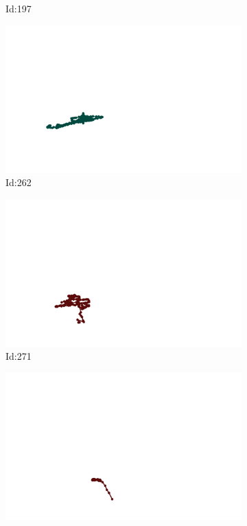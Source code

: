 \documentclass[12pt,twoside]{report}
\begin{document}
\begin{figure}
\begin{subfigure}[b]{0.20\textwidth}
\caption{Id:197}
\end{subfigure}
\begin{subfigure}[b]{0.20\textwidth}
\centering
\includegraphics[width=\textwidth]{../trajectories/262.png}
\caption{Id:262}
\end{subfigure}
\begin{subfigure}[b]{0.20\textwidth}
\centering
\includegraphics[width=\textwidth]{../trajectories/271.png}
\caption{Id:271}
\end{subfigure}
\begin{subfigure}[b]{0.20\textwidth}
\centering
\includegraphics[width=\textwidth]{../trajectories/411.png}

\end{subfigure}
\end{figure}
\end{document}
